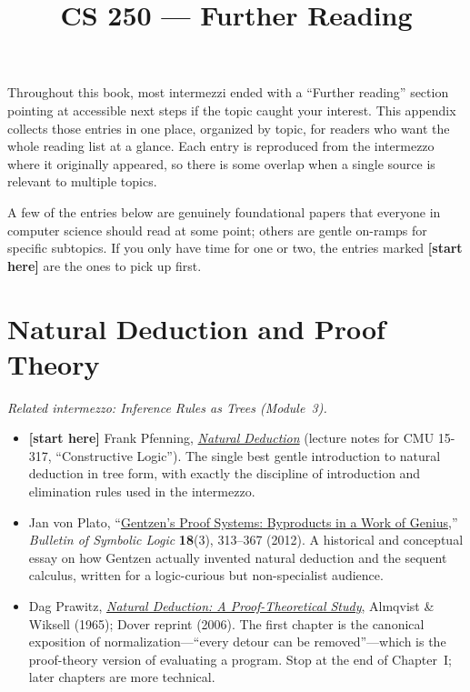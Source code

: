 \documentclass[11pt]{article}
\title{CS 250 --- Further Reading}
\author{}
\date{}
\begin{document}
\maketitle

Throughout this book, most intermezzi ended with a ``Further reading'' section
pointing at accessible next steps if the topic caught your interest. This
appendix collects those entries in one place, organized by topic, for readers
who want the whole reading list at a glance. Each entry is reproduced from the
intermezzo where it originally appeared, so there is some overlap when a
single source is relevant to multiple topics.

A few of the entries below are genuinely foundational papers that everyone in
computer science should read at some point; others are gentle on-ramps for
specific subtopics. If you only have time for one or two, the entries marked
\textbf{[start here]} are the ones to pick up first.

\section*{Natural Deduction and Proof Theory}
\emph{Related intermezzo: Inference Rules as Trees (Module~3).}

\begin{itemize}
  \item \textbf{[start here]} Frank Pfenning, \href{https://www.cs.cmu.edu/~fp/courses/15317-s23/lectures/02-natded.pdf}{\emph{Natural Deduction}} (lecture notes for CMU 15-317, ``Constructive Logic''). The single best gentle introduction to natural deduction in tree form, with exactly the discipline of introduction and elimination rules used in the intermezzo.
  \item Jan von Plato, ``\href{https://projecteuclid.org/journals/bulletin-of-symbolic-logic/volume-18/issue-3/Gentzens-proof-systems-byproducts-in-a-work-of-genius/10.2178/bsl/1344861886.short}{Gentzen's Proof Systems: Byproducts in a Work of Genius},'' \emph{Bulletin of Symbolic Logic} \textbf{18}(3), 313--367 (2012). A historical and conceptual essay on how Gentzen actually invented natural deduction and the sequent calculus, written for a logic-curious but non-specialist audience.
  \item Dag Prawitz, \emph{\href{https://store.doverpublications.com/0486446557.html}{Natural Deduction: A Proof-Theoretical Study}}, Almqvist \& Wiksell (1965); Dover reprint (2006). The first chapter is the canonical exposition of normalization---``every detour can be removed''---which is the proof-theory version of evaluating a program. Stop at the end of Chapter~I; later chapters are more technical.
\end{itemize}
\end{document}
